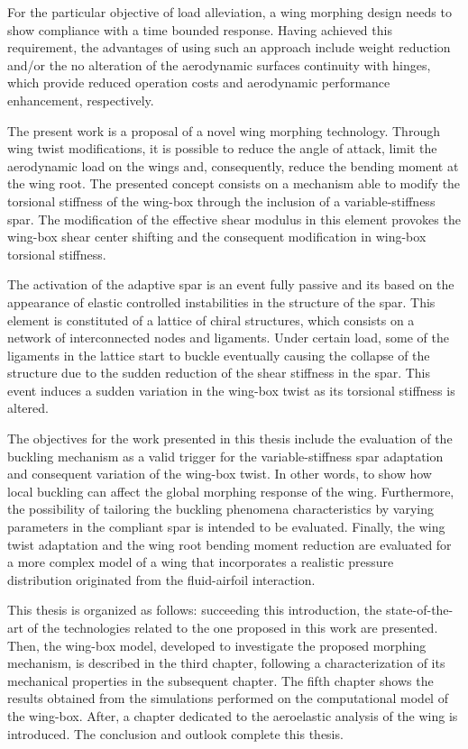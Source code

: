 For the particular objective of load alleviation, a wing morphing design needs to show compliance with a time bounded response. Having achieved this requirement, the advantages of using such an approach include weight reduction and/or the no alteration of the aerodynamic surfaces continuity with hinges, which provide reduced operation costs and aerodynamic performance enhancement, respectively.

The present work is a proposal of a novel wing morphing technology. Through wing twist modifications, it is possible to reduce the angle of attack, limit the aerodynamic load on the wings and, consequently, reduce the bending moment at the wing root. The presented concept consists on a mechanism able to modify the torsional stiffness of the wing-box through the inclusion of a variable-stiffness spar. The modification of the effective shear modulus in this element provokes the wing-box shear center shifting and the consequent modification in wing-box torsional stiffness. 

The activation of the adaptive spar is an event fully passive and its based on the appearance of elastic controlled instabilities in the structure of the spar. This element is constituted of a lattice of chiral structures, which consists on a network of interconnected nodes and ligaments. Under certain load, some of the ligaments in the lattice start to buckle eventually causing the collapse of the structure due to the sudden reduction of the shear stiffness in the spar. This event induces a sudden variation in the wing-box twist as its torsional stiffness is altered.

The objectives for the work presented in this thesis include the evaluation of the buckling mechanism as a valid trigger for the variable-stiffness spar adaptation and consequent variation of the wing-box twist. In other words, to show how local buckling can affect the global morphing response of the wing. Furthermore, the possibility of tailoring the buckling phenomena characteristics by varying parameters in the compliant spar is intended to be evaluated. Finally, the wing twist adaptation and the wing root bending moment reduction are evaluated for a more complex model of a wing that incorporates a realistic pressure distribution originated from the fluid-airfoil interaction. 

This thesis is organized as follows: succeeding this introduction, the state-of-the-art of the technologies related to the one proposed in this work are presented. Then, the wing-box model, developed to investigate the proposed morphing mechanism, is described in the third chapter, following a characterization of its mechanical properties in the subsequent chapter. The fifth chapter shows the results obtained from the simulations performed on the computational model of the wing-box. After, a chapter dedicated to the aeroelastic analysis of the wing is introduced. The conclusion and outlook complete this thesis.
